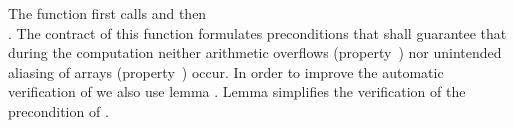 The function  first calls \adjacentdifference and then\\
\partialsum.
The contract of this function formulates preconditions that shall guarantee
that during the computation neither arithmetic overflows (property~)
nor unintended aliasing of arrays (property~) occur.
In order to improve the automatic verification of 
\adjacentdifferenceinv we also use lemma .
Lemma  simplifies
the verification of the precondition  of \partialsum.




